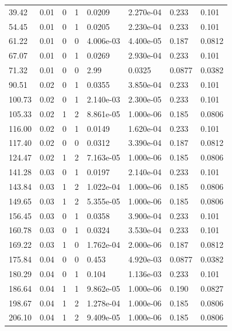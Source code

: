\documentclass[preview]{standalone}
\begin{document}
{{\begin{tabular}{L{1.2cm}C{1.2cm} C{0.3cm}C{0.5cm} C{1.4cm}C{1.4cm} C{1.4cm}C{1.4cm}}
  39.42  &  0.01  & 0     &  1 &  0.0209  & 2.270e-04  & 0.233 &  0.101   \\ 
  54.45  &  0.01  & 0     &  1 &  0.0205  & 2.230e-04  & 0.233 &  0.101   \\ 
  61.22  &  0.01  & 0     &  0 &  4.006e-03  & 4.400e-05  & 0.187 &  0.0812   \\ 
  67.07  &  0.01  & 0     &  1 &  0.0269  & 2.930e-04  & 0.233 &  0.101   \\ 
  71.32  &  0.01  & 0     &  0 &  2.99  & 0.0325  & 0.0877 &  0.0382   \\ 
  90.51  &  0.02  & 0     &  1 &  0.0355  & 3.850e-04  & 0.233 &  0.101   \\ 
  100.73  &  0.02  & 0     &  1 &  2.140e-03  & 2.300e-05  & 0.233 &  0.101   \\ 
  105.33  &  0.02  & 1     &  2 &  8.861e-05  & 1.000e-06  & 0.185 &  0.0806   \\ 
  116.00  &  0.02  & 0     &  1 &  0.0149  & 1.620e-04  & 0.233 &  0.101   \\ 
  117.40  &  0.02  & 0     &  0 &  0.0312  & 3.390e-04  & 0.187 &  0.0812   \\ 
  124.47  &  0.02  & 1     &  2 &  7.163e-05  & 1.000e-06  & 0.185 &  0.0806   \\ 
  141.28  &  0.03  & 0     &  1 &  0.0197  & 2.140e-04  & 0.233 &  0.101   \\ 
  143.84  &  0.03  & 1     &  2 &  1.022e-04  & 1.000e-06  & 0.185 &  0.0806   \\ 
  149.65  &  0.03  & 1     &  2 &  5.355e-05  & 1.000e-06  & 0.185 &  0.0806   \\ 
  156.45  &  0.03  & 0     &  1 &  0.0358  & 3.900e-04  & 0.233 &  0.101   \\ 
  160.78  &  0.03  & 0     &  1 &  0.0324  & 3.530e-04  & 0.233 &  0.101   \\ 
  169.22  &  0.03  & 1     &  0 &  1.762e-04  & 2.000e-06  & 0.187 &  0.0812   \\ 
  175.84  &  0.04  & 0     &  0 &  0.453  & 4.920e-03  & 0.0877 &  0.0382   \\ 
  180.29  &  0.04  & 0     &  1 &  0.104  & 1.136e-03  & 0.233 &  0.101   \\ 
  186.64  &  0.04  & 1     &  1 &  9.862e-05  & 1.000e-06  & 0.190 &  0.0827   \\ 
  198.67  &  0.04  & 1     &  2 &  1.278e-04  & 1.000e-06  & 0.185 &  0.0806   \\ 
  206.10  &  0.04  & 1     &  2 &  9.409e-05  & 1.000e-06  & 0.185 &  0.0806   \\ 

\end{tabular}}}
\end{document}
